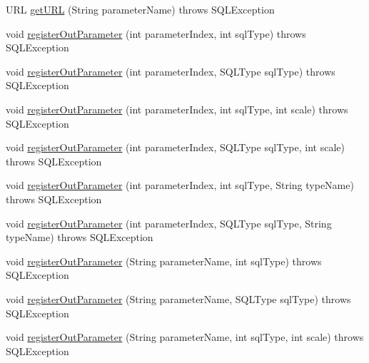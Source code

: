 \begin{DoxyCompactItemize}
U\+RL \mbox{\hyperlink{classcom_1_1mysql_1_1cj_1_1jdbc_1_1_callable_statement_a08e77360a042f37ef9afdd164461e343}{get\+U\+RL}} (String parameter\+Name)  throws S\+Q\+L\+Exception 
\item 
void \mbox{\hyperlink{classcom_1_1mysql_1_1cj_1_1jdbc_1_1_callable_statement_ad0d91ad3712a15309404949c3cc97739}{register\+Out\+Parameter}} (int parameter\+Index, int sql\+Type)  throws S\+Q\+L\+Exception 
\item 
void \mbox{\hyperlink{classcom_1_1mysql_1_1cj_1_1jdbc_1_1_callable_statement_af786267d341962a98bab672e1e7264be}{register\+Out\+Parameter}} (int parameter\+Index, S\+Q\+L\+Type sql\+Type)  throws S\+Q\+L\+Exception 
\item 
void \mbox{\hyperlink{classcom_1_1mysql_1_1cj_1_1jdbc_1_1_callable_statement_afe234609ae506d56697f519c3d29ebf8}{register\+Out\+Parameter}} (int parameter\+Index, int sql\+Type, int scale)  throws S\+Q\+L\+Exception 
\item 
void \mbox{\hyperlink{classcom_1_1mysql_1_1cj_1_1jdbc_1_1_callable_statement_ae9462bde5501d87b6c7abb207b3e651f}{register\+Out\+Parameter}} (int parameter\+Index, S\+Q\+L\+Type sql\+Type, int scale)  throws S\+Q\+L\+Exception 
\item 
void \mbox{\hyperlink{classcom_1_1mysql_1_1cj_1_1jdbc_1_1_callable_statement_a459e48382513438b924cd04576796915}{register\+Out\+Parameter}} (int parameter\+Index, int sql\+Type, String type\+Name)  throws S\+Q\+L\+Exception 
\item 
void \mbox{\hyperlink{classcom_1_1mysql_1_1cj_1_1jdbc_1_1_callable_statement_ace571cca0105d534b9292c74b182a98b}{register\+Out\+Parameter}} (int parameter\+Index, S\+Q\+L\+Type sql\+Type, String type\+Name)  throws S\+Q\+L\+Exception 
\item 
void \mbox{\hyperlink{classcom_1_1mysql_1_1cj_1_1jdbc_1_1_callable_statement_a0fad8371936ac7040051d7158cea4024}{register\+Out\+Parameter}} (String parameter\+Name, int sql\+Type)  throws S\+Q\+L\+Exception 
\item 
void \mbox{\hyperlink{classcom_1_1mysql_1_1cj_1_1jdbc_1_1_callable_statement_a8dea8bf7c641c3b819ac3442f5a515d5}{register\+Out\+Parameter}} (String parameter\+Name, S\+Q\+L\+Type sql\+Type)  throws S\+Q\+L\+Exception 
\item 
void \mbox{\hyperlink{classcom_1_1mysql_1_1cj_1_1jdbc_1_1_callable_statement_ac0d18bc90e504b9bc2d2ba65c6562223}{register\+Out\+Parameter}} (String parameter\+Name, int sql\+Type, int scale)  throws S\+Q\+L\+Exception 
\item 

\end{DoxyCompactItemize}
